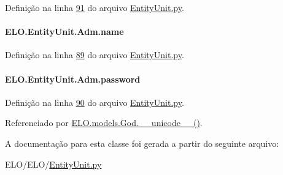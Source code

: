 Definição na linha \hyperlink{EntityUnit_8py_source_l00091}{91} do arquivo \hyperlink{EntityUnit_8py_source}{Entity\-Unit.\-py}.

\hypertarget{classELO_1_1EntityUnit_1_1Adm_a12f7aaf17dc6e036186e7757244cd12a}{
\paragraph[{name}]{\setlength{\rightskip}{0pt plus 5cm}E\-L\-O.\-Entity\-Unit.\-Adm.\-name}}\label{classELO_1_1EntityUnit_1_1Adm_a12f7aaf17dc6e036186e7757244cd12a}


Definição na linha \hyperlink{EntityUnit_8py_source_l00089}{89} do arquivo \hyperlink{EntityUnit_8py_source}{Entity\-Unit.\-py}.

\hypertarget{classELO_1_1EntityUnit_1_1Adm_aed97c3f4efa1320ef99b3794b51f8e5e}{
\paragraph[{password}]{\setlength{\rightskip}{0pt plus 5cm}E\-L\-O.\-Entity\-Unit.\-Adm.\-password}}\label{classELO_1_1EntityUnit_1_1Adm_aed97c3f4efa1320ef99b3794b51f8e5e}


Definição na linha \hyperlink{EntityUnit_8py_source_l00090}{90} do arquivo \hyperlink{EntityUnit_8py_source}{Entity\-Unit.\-py}.



Referenciado por \hyperlink{classELO_1_1models_1_1God_aec7e462406b98293c953589a3a368825}{E\-L\-O.\-models.\-God.\-\_\-\-\_\-unicode\-\_\-\-\_\-()}.



A documentação para esta classe foi gerada a partir do seguinte arquivo\-:\begin{DoxyCompactItemize}
\item 
E\-L\-O/\-E\-L\-O/\hyperlink{EntityUnit_8py}{Entity\-Unit.\-py}\end{DoxyCompactItemize}
